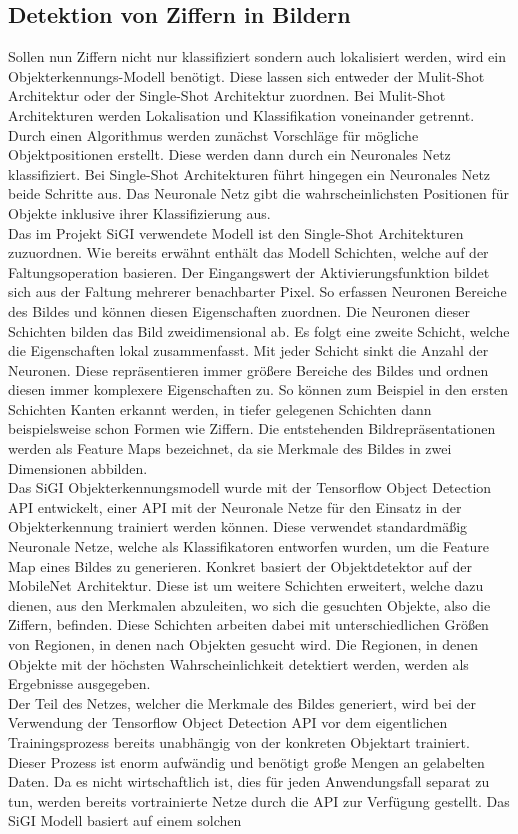 \subsection{Detektion von Ziffern in Bildern}\label{subsec:Anwendungen in der Bildverarbeitung}
    Sollen nun Ziffern nicht nur klassifiziert sondern auch lokalisiert werden, wird ein Objekterkennungs-Modell benötigt. Diese lassen sich entweder der Mulit-Shot Architektur oder der Single-Shot Architektur zuordnen. Bei Mulit-Shot Architekturen werden Lokalisation und Klassifikation voneinander getrennt. Durch einen Algorithmus werden zunächst Vorschläge für mögliche Objektpositionen erstellt. Diese werden dann durch ein Neuronales Netz klassifiziert. Bei Single-Shot Architekturen führt hingegen ein Neuronales Netz beide Schritte aus\cite{Pang2019-2}. Das Neuronale Netz gibt die wahrscheinlichsten Positionen für Objekte inklusive ihrer Klassifizierung aus.\\ Das im Projekt SiGI verwendete Modell ist den Single-Shot Architekturen zuzuordnen. Wie bereits erwähnt enthält das Modell Schichten, welche auf der Faltungsoperation basieren. Der Eingangswert der Aktivierungsfunktion bildet sich aus der Faltung mehrerer benachbarter Pixel. So erfassen Neuronen Bereiche des Bildes und können diesen Eigenschaften zuordnen. Die Neuronen dieser Schichten bilden das Bild zweidimensional ab. Es folgt eine zweite Schicht, welche die Eigenschaften lokal zusammenfasst. Mit jeder Schicht sinkt die Anzahl der Neuronen. Diese repräsentieren immer größere Bereiche des Bildes und ordnen diesen immer komplexere Eigenschaften zu. So können zum Beispiel in den ersten Schichten Kanten erkannt werden, in tiefer gelegenen Schichten dann beispielsweise schon Formen wie Ziffern. Die entstehenden Bildrepräsentationen werden als Feature Maps bezeichnet, da sie Merkmale des Bildes in zwei Dimensionen abbilden\cite{Xiao2021}.\\ Das SiGI Objekterkennungsmodell wurde mit der Tensorflow Object Detection API entwickelt, einer API mit der Neuronale Netze für den Einsatz in der Objekterkennung trainiert werden können. Diese verwendet standardmäßig Neuronale Netze, welche als Klassifikatoren entworfen wurden, um die Feature Map eines Bildes zu generieren. Konkret basiert der Objektdetektor auf der MobileNet Architektur. Diese ist um weitere Schichten erweitert, welche dazu dienen, aus den Merkmalen abzuleiten, wo sich die gesuchten Objekte, also die Ziffern, befinden. Diese Schichten arbeiten dabei mit unterschiedlichen Größen von Regionen, in denen nach Objekten gesucht wird. Die Regionen, in denen Objekte mit der höchsten Wahrscheinlichkeit detektiert werden, werden als Ergebnisse ausgegeben\cite{Chen2021}.\\ Der Teil des Netzes, welcher die Merkmale des Bildes generiert, wird bei der Verwendung der Tensorflow Object Detection API vor dem eigentlichen Trainingsprozess bereits unabhängig von der konkreten Objektart trainiert. Dieser Prozess ist enorm aufwändig und benötigt große Mengen an gelabelten Daten. Da es nicht wirtschaftlich ist, dies für jeden Anwendungsfall separat zu tun, werden bereits vortrainierte Netze durch die API zur Verfügung gestellt\cite{TFODAPI}. Das SiGI Modell basiert auf einem solchen 